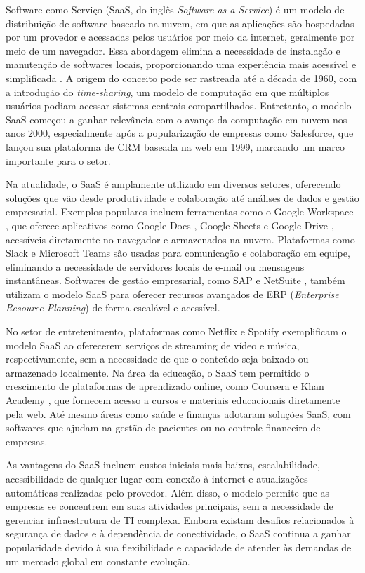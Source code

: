 Software como Serviço (\acrshort{SaaS}, do inglês \textit{Software as a Service}) é um modelo de distribuição de software baseado na nuvem, em que as aplicações são hospedadas por um provedor e acessadas pelos usuários por meio da internet, geralmente por meio de um navegador. Essa abordagem elimina a necessidade de instalação e manutenção de softwares locais, proporcionando uma experiência mais acessível e simplificada \cite{1236470}. A origem do conceito pode ser rastreada até a década de 1960, com a introdução do \textit{time-sharing}, um modelo de computação em que múltiplos usuários podiam acessar sistemas centrais compartilhados. Entretanto, o modelo SaaS começou a ganhar relevância com o avanço da computação em nuvem nos anos 2000, especialmente após a popularização de empresas como Salesforce, que lançou sua plataforma de \acrfull{CRM} baseada na web em 1999, marcando um marco importante para o setor.

Na atualidade, o SaaS é amplamente utilizado em diversos setores, oferecendo soluções que vão desde produtividade e colaboração até análises de dados e gestão empresarial. Exemplos populares incluem ferramentas como o Google Workspace \cite{GOOGLE_WORKSPACE}, que oferece aplicativos como Google Docs \cite{GOOGLE_DOCS}, Google Sheets \cite{GOOGLE_SHEETS} e Google Drive \cite{GOOGLE_DRIVE}, acessíveis diretamente no navegador e armazenados na nuvem. Plataformas como Slack \cite{SLACK} e Microsoft Teams \cite{TEAMS} são usadas para comunicação e colaboração em equipe, eliminando a necessidade de servidores locais de e-mail ou mensagens instantâneas. Softwares de gestão empresarial, como SAP \cite{SAP} e NetSuite \cite{NETSUITE}, também utilizam o modelo SaaS para oferecer recursos avançados de ERP (\textit{Enterprise Resource Planning}) de forma escalável e acessível.

No setor de entretenimento, plataformas como Netflix \cite{NETFLIX} e Spotify \cite{SPOTIFY} exemplificam o modelo SaaS ao oferecerem serviços de streaming de vídeo e música, respectivamente, sem a necessidade de que o conteúdo seja baixado ou armazenado localmente. Na área da educação, o SaaS tem permitido o crescimento de plataformas de aprendizado online, como Coursera \cite{COURSERA} e Khan Academy \cite{KHANACADEMY}, que fornecem acesso a cursos e materiais educacionais diretamente pela web. Até mesmo áreas como saúde e finanças adotaram soluções SaaS, com softwares que ajudam na gestão de pacientes ou no controle financeiro de empresas.

As vantagens do SaaS incluem custos iniciais mais baixos, escalabilidade, acessibilidade de qualquer lugar com conexão à internet e atualizações automáticas realizadas pelo provedor. Além disso, o modelo permite que as empresas se concentrem em suas atividades principais, sem a necessidade de gerenciar infraestrutura de TI complexa. Embora existam desafios relacionados à segurança de dados e à dependência de conectividade, o SaaS continua a ganhar popularidade devido à sua flexibilidade e capacidade de atender às demandas de um mercado global em constante evolução.
